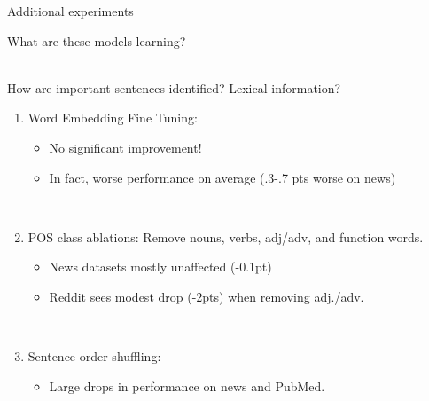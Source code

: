 \begin{frame}{Additional experiments}

What are these models learning? 

~\\

How are important sentences identified? Lexical information?

\begin{enumerate}
    \item<2-> Word Embedding Fine Tuning: 
        \begin{itemize}
            \item<3-> No significant improvement! 
            \item<3-> In fact, worse performance on average (.3-.7 pts worse on news) 
        \end{itemize}
                ~\\
    \item<4-> POS class ablations: Remove nouns, verbs, adj/adv, and function
        words.
        \begin{itemize}
            \item<5-> News datasets mostly unaffected (-0.1pt)
            \item<5-> Reddit sees modest drop (-2pts) when removing adj./adv.
        \end{itemize}
    ~\\
    \item<6-> Sentence order shuffling:
        \begin{itemize}
            \item<7-> Large drops in performance on news and PubMed. 
        \end{itemize}
        
\end{enumerate}



\end{frame}


